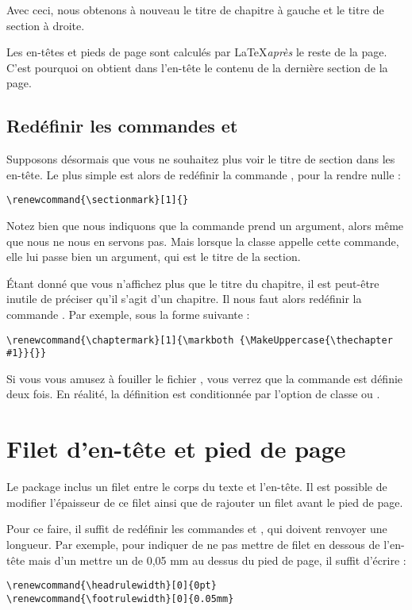 Avec ceci, nous obtenons à nouveau le titre de chapitre à gauche et le titre de section à droite.

\begin{attention}
Les en-têtes et pieds de page sont calculés par \LaTeX \emph{après} le reste de la page. C'est pourquoi on obtient dans l'en-tête le contenu de la dernière section de la page.
\end{attention}

\subsection{Redéfinir les commandes  et }

Supposons désormais que vous ne souhaitez plus voir le titre de section dans les en-tête. Le plus simple est alors de redéfinir la commande , pour la rendre nulle :

\begin{verbatim}
\renewcommand{\sectionmark}[1]{}
\end{verbatim}

\begin{attention}
Notez bien que nous indiquons que la commande  prend un argument, alors même que nous ne nous en servons pas. Mais lorsque la classe  appelle cette commande, elle lui passe bien un argument, qui est le titre de la section.
\end{attention}

Étant donné que vous n'affichez plus que le titre du chapitre, il est peut-être inutile de préciser qu'il s'agit d'un chapitre. Il nous faut alors redéfinir la commande . Par exemple, sous la forme suivante :

\begin{verbatim}
\renewcommand{\chaptermark}[1]{\markboth {\MakeUppercase{\thechapter #1}}{}}
\end{verbatim}


\begin{plusloins}
Si vous vous amusez à fouiller le fichier , vous verrez que la commande  est définie deux fois. En réalité, la définition est conditionnée par l'option de classe  ou .
\end{plusloins}
\section{Filet d'en-tête et pied de page}

Le package  inclus un filet entre le corps du texte et l'en-tête. Il est possible de modifier l'épaisseur de ce filet ainsi que de rajouter un filet avant le  pied de page.

Pour ce faire, il suffit de redéfinir les commandes  et , qui doivent renvoyer une longueur.
Par exemple, pour indiquer de ne pas mettre de filet en dessous de l'en-tête mais d'un mettre un de 0,05 mm au  dessus du pied de page, il suffit d'écrire : 
\begin{verbatim}
\renewcommand{\headrulewidth}[0]{0pt}
\renewcommand{\footrulewidth}[0]{0.05mm}
\end{verbatim}
